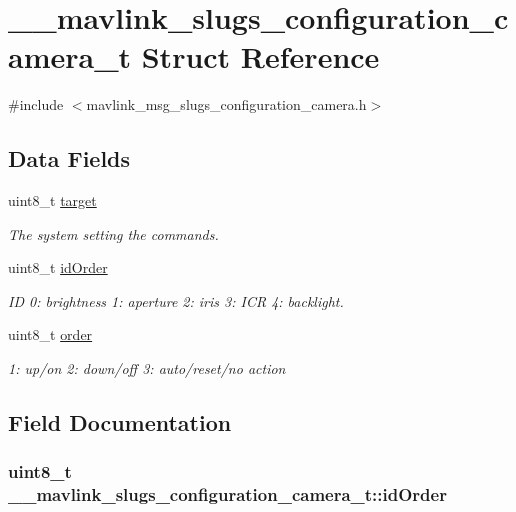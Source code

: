 \hypertarget{struct____mavlink__slugs__configuration__camera__t}{\section{\+\_\+\+\_\+mavlink\+\_\+slugs\+\_\+configuration\+\_\+camera\+\_\+t Struct Reference}
\label{struct____mavlink__slugs__configuration__camera__t}
}


{\ttfamily \#include $<$mavlink\+\_\+msg\+\_\+slugs\+\_\+configuration\+\_\+camera.\+h$>$}

\subsection*{Data Fields}
\begin{DoxyCompactItemize}
\item 
uint8\+\_\+t \hyperlink{struct____mavlink__slugs__configuration__camera__t_a83b0e2edae59150e886e3e539c905817}{target}
\begin{DoxyCompactList}\small\item\em The system setting the commands. \end{DoxyCompactList}\item 
uint8\+\_\+t \hyperlink{struct____mavlink__slugs__configuration__camera__t_a0e778edac03463b4f394613552166217}{id\+Order}
\begin{DoxyCompactList}\small\item\em I\+D 0\+: brightness 1\+: aperture 2\+: iris 3\+: I\+C\+R 4\+: backlight. \end{DoxyCompactList}\item 
uint8\+\_\+t \hyperlink{struct____mavlink__slugs__configuration__camera__t_ac5c553da1804f7c8cc704ed4c8a1ab4a}{order}
\begin{DoxyCompactList}\small\item\em 1\+: up/on 2\+: down/off 3\+: auto/reset/no action \end{DoxyCompactList}\end{DoxyCompactItemize}


\subsection{Field Documentation}
\hypertarget{struct____mavlink__slugs__configuration__camera__t_a0e778edac03463b4f394613552166217}{
\subsubsection[{id\+Order}]{\setlength{\rightskip}{0pt plus 5cm}uint8\+\_\+t \+\_\+\+\_\+mavlink\+\_\+slugs\+\_\+configuration\+\_\+camera\+\_\+t\+::id\+Order}}\label{struct____mavlink__slugs__configuration__camera__t_a0e778edac03463b4f394613552166217}


